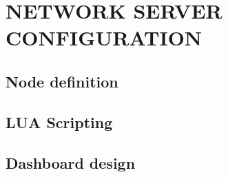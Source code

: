 \section{NETWORK SERVER CONFIGURATION}
\subsection{Node definition}
\clearpage
\subsection{LUA Scripting}
\clearpage
\subsection{Dashboard design}
\clearpage